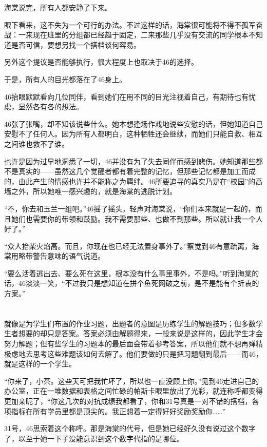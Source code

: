 海棠说完，所有人都安静了下来。

眼下看来，这不失为一个可行的办法。不过这样的话，海棠很可能将不得不孤军奋战：一来现在班里的分组都已经趋于固定，二来那些几乎没有交流的同学根本不知道是否可信，要想另找一个搭档谈何容易。

另外这个提议是否能够执行，很大程度上也取决于46的选择。

于是，所有人的目光都落在了46身上。

46抬眼默默看向几位同伴，看到她们在用不同的目光注视着自己，有期待也有忧虑，显然各有各的想法。

46张了张嘴，却不知该说些什么。她本想逢场作戏地说些安慰的话，但她知道自己安慰不了任何人。因为所有人都明白，这种牺牲还会继续，而她们只能自救、相互之间谁也救不了谁。

也许是因为过早地洞悉了一切，46并没有为了失去同伴而感到悲伤。她知道那些都不是真实的——虽然这几个觉醒者都有着完整的记忆，但那些记忆都是加工而成的，由此产生的情感也许并不能称之为羁绊。46所要追寻的真实乃是在“校园”的高墙之外，所以她唯一感兴趣的，就是海棠的逃脱计划。

“不，你去和玉兰一组吧。”46摇了摇头，轻声对海棠说，“你们本来就是一起的，而且她们也需要你的带领和鼓励。我不需要那些、也做不到那些。所以就让我一个人好了。”

“众人拾柴火焰高。而且，你现在也已经无法置身事外了。”察觉到46有意疏离，海棠用略带警告意味的语气说道。

“要么活着逃出去、要么死在这里，根本没有什么事里事外，不是吗。”听到海棠的话，46淡淡一笑，“不过我只是想知道在拼个鱼死网破之前，是不是能有个折衷的方案。”

\section*{}

就像是为学生们布置的作业习题，出题者的意图是历练学生的解题技巧；但多数学生者想要的却只是答案。答案必须由解题得来，一般来说是这样的，因此学生才会努力解题；但有些学生的习题本的最后面会带着参考答案，所以他们就不想再殚精极虑地去思考这些难题该如何去解了。他们要做的只是把习题翻到最后——而46，就是这样的一个学生。

“你来了，小茶。这些天可把我忙坏了，所以也一直没顾上你。”见到46走进自己的办公室，正在一堆数据和表格之间忙碌的帕斯卡眼里放出了光彩，就连称呼都变得更加亲昵了，“你这几次的对抗成绩我都看了，你和31号真是一对不错的搭档，各项指标在所有学员里都是顶尖的。我正想着一定得好好奖励奖励你……”

31号，46思索着这个称呼。那是海棠的代号，但是她已经好久没有说过这个数字了，以至于她一下子没能意识到这个数字代指的是哪位。

